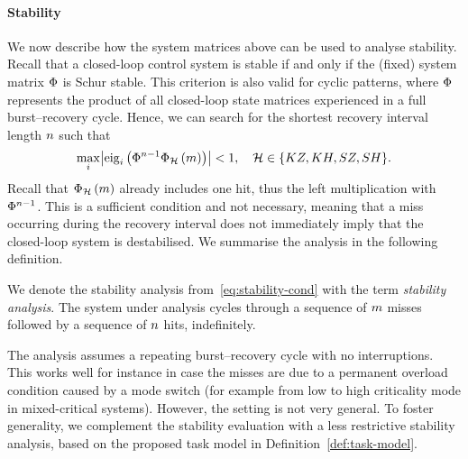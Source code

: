 \paragraph*{Stability}%

We now describe how the system matrices above can be used to analyse stability. 
Recall that a closed-loop control system is stable if and only if the (fixed) system matrix $\Phi{}$ is Schur stable. 
This criterion is also valid for cyclic patterns, where $\Phi{}$ represents the product of all closed-loop state matrices experienced in a full burst--recovery cycle. 
Hence, we can search for the shortest recovery interval length $n$ such that
%
\begin{equation}
\label{eq:stability-cond}
    \underset{i}{\max}{\abs{\eig{i}{\clmat{}^{\numhits-1}\clmat{}_{\strat}\funof{\nummisses}}}} < 1, \quad \strat \in  \{ KZ, KH, SZ, SH \}.
\end{equation}
%
Recall that $\Phi{}_{\mathcal{H}}\left( m \right)$ already includes one hit, thus the left multiplication with $\Phi{}^{n-1}$. 
This is a sufficient condition and not necessary, meaning that a miss occurring during the recovery interval does not immediately imply that the closed-loop system is destabilised. 
We summarise the analysis in the following definition.

\begin{definition}%
    We denote the stability analysis from~\eqref{eq:stability-cond} with the term \emph{\nilsstability{} stability analysis}.
    The system under analysis cycles through a sequence of $m$ misses followed by a sequence of $n$ hits, indefinitely.
\end{definition}
%
The \nilsstability{} analysis assumes a repeating burst--recovery cycle with no interruptions.
This works well for instance in case the misses are due to a permanent overload condition caused by a mode switch (for example from low to high criticality mode in mixed-critical systems).
However, the setting is not very general.
To foster generality, we complement the stability evaluation with a less restrictive stability analysis, based on the proposed task model in Definition~\ref{def:task-model}.

